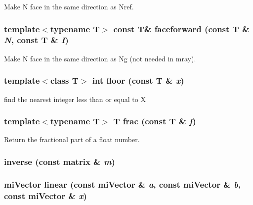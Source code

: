 Make N face in the same direction as Nref. 

\subsubsection{\setlength{\rightskip}{0pt plus 5cm}template$<$typename T$>$ const T\& faceforward (const T \& {\em N}, const T \& {\em I})}\label{namespacersl_a6}


Make N face in the same direction as Ng (not needed in mray). 

\subsubsection{\setlength{\rightskip}{0pt plus 5cm}template$<$class T$>$ int floor (const T \& {\em x})\hspace{0.3cm}{\tt  [inline]}}\label{namespacersl_a39}


find the nearest integer less than or equal to X 

\subsubsection{\setlength{\rightskip}{0pt plus 5cm}template$<$typename T$>$ T frac (const T \& {\em f})\hspace{0.3cm}{\tt  [inline]}}\label{namespacersl_a4}


Return the fractional part of a float number. 

\subsubsection{ inverse (const matrix \& {\em m})\hspace{0.3cm}{\tt  [inline]}}\label{namespacersl_a155}


\subsubsection{\setlength{\rightskip}{0pt plus 5cm}mi\-Vector linear (const mi\-Vector \& {\em a}, const mi\-Vector \& {\em b}, const mi\-Vector \& {\em x})\hspace{0.3cm}{\tt  [inline]}}\label{namespacersl_a10}


